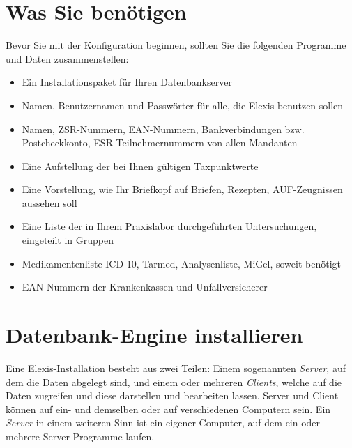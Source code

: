 \section{Was Sie benötigen}
Bevor Sie mit der Konfiguration beginnen, sollten Sie die folgenden Programme und Daten zusammenstellen:
\begin{itemize}
  \item Ein Installationspaket für Ihren Datenbankserver
  \item Namen, Benutzernamen und Passwörter für alle, die Elexis benutzen sollen
  \item Namen, ZSR-Nummern, EAN-Nummern, Bankverbindungen bzw. Postcheckkonto, ESR-Teilnehmernummern von allen Mandanten
  \item Eine Aufstellung der bei Ihnen gültigen Taxpunktwerte
  \item Eine Vorstellung, wie Ihr Briefkopf auf Briefen, Rezepten, AUF-Zeugnissen aussehen soll
  \item Eine Liste der in Ihrem Praxislabor durchgeführten Untersuchungen, eingeteilt in Gruppen
  \item Medikamentenliste ICD-10, Tarmed, Analysenliste, MiGel, soweit benötigt
  \item EAN-Nummern der Krankenkassen und Unfallversicherer
\end{itemize}

\section{Datenbank-Engine installieren}
\label{dbengine}
Eine Elexis-Installation besteht aus zwei Teilen: Einem sogenannten \textit{Server}, auf dem die Daten
abgelegt sind, und einem oder mehreren \textit{Clients}, welche auf die Daten zugreifen und diese darstellen
und bearbeiten lassen. Server und Client können auf ein- und demselben oder auf verschiedenen Computern sein.
Ein \textit{\textit{Server}} in einem weiteren Sinn ist ein eigener Computer, auf dem ein oder mehrere
Server-Programme laufen.

